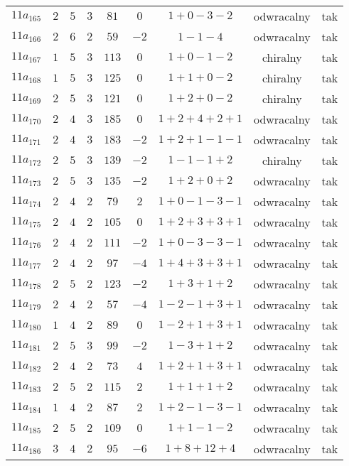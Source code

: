 \begin{longtable}{ccccccccc}
$11a_{165}$ & $2$ & $5$ & $3$ & $81$ & $0$ & $1+0-3-2$ & odwracalny & tak \\
$11a_{166}$ & $2$ & $6$ & $2$ & $59$ & $-2$ & $1-1-4$ & odwracalny & tak \\
$11a_{167}$ & $1$ & $5$ & $3$ & $113$ & $0$ & $1+0-1-2$ & chiralny & tak \\
$11a_{168}$ & $1$ & $5$ & $3$ & $125$ & $0$ & $1+1+0-2$ & chiralny & tak \\
$11a_{169}$ & $2$ & $5$ & $3$ & $121$ & $0$ & $1+2+0-2$ & chiralny & tak \\
$11a_{170}$ & $2$ & $4$ & $3$ & $185$ & $0$ & $1+2+4+2+1$ & odwracalny & tak \\
$11a_{171}$ & $2$ & $4$ & $3$ & $183$ & $-2$ & $1+2+1-1-1$ & odwracalny & tak \\
$11a_{172}$ & $2$ & $5$ & $3$ & $139$ & $-2$ & $1-1-1+2$ & chiralny & tak \\
$11a_{173}$ & $2$ & $5$ & $3$ & $135$ & $-2$ & $1+2+0+2$ & odwracalny & tak \\
$11a_{174}$ & $2$ & $4$ & $2$ & $79$ & $2$ & $1+0-1-3-1$ & odwracalny & tak \\
$11a_{175}$ & $2$ & $4$ & $2$ & $105$ & $0$ & $1+2+3+3+1$ & odwracalny & tak \\
$11a_{176}$ & $2$ & $4$ & $2$ & $111$ & $-2$ & $1+0-3-3-1$ & odwracalny & tak \\
$11a_{177}$ & $2$ & $4$ & $2$ & $97$ & $-4$ & $1+4+3+3+1$ & odwracalny & tak \\
$11a_{178}$ & $2$ & $5$ & $2$ & $123$ & $-2$ & $1+3+1+2$ & odwracalny & tak \\
$11a_{179}$ & $2$ & $4$ & $2$ & $57$ & $-4$ & $1-2-1+3+1$ & odwracalny & tak \\
$11a_{180}$ & $1$ & $4$ & $2$ & $89$ & $0$ & $1-2+1+3+1$ & odwracalny & tak \\
$11a_{181}$ & $2$ & $5$ & $3$ & $99$ & $-2$ & $1-3+1+2$ & odwracalny & tak \\
$11a_{182}$ & $2$ & $4$ & $2$ & $73$ & $4$ & $1+2+1+3+1$ & odwracalny & tak \\
$11a_{183}$ & $2$ & $5$ & $2$ & $115$ & $2$ & $1+1+1+2$ & odwracalny & tak \\
$11a_{184}$ & $1$ & $4$ & $2$ & $87$ & $2$ & $1+2-1-3-1$ & odwracalny & tak \\
$11a_{185}$ & $2$ & $5$ & $2$ & $109$ & $0$ & $1+1-1-2$ & odwracalny & tak \\
$11a_{186}$ & $3$ & $4$ & $2$ & $95$ & $-6$ & $1+8+12+4$ & odwracalny & tak \\

\end{longtable}

